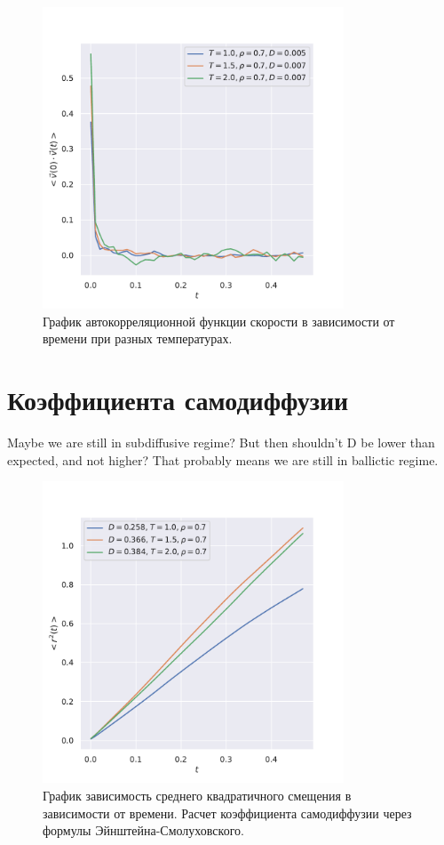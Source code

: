 \documentclass[a4paper,12pt]{article}
\begin{document}
\begin{figure}[H]
    \centering
    \includegraphics[width=0.8\textwidth]{../../media/vac.pdf}
\caption{График автокорреляционной функции
    скорости в зависимости от времени при разных
температурах.}
\end{figure}

\section{Коэффициента самодиффузии}

{\color{red} Maybe we are still in subdiffusive regime?
But then shouldn't D be lower than expected, and not
higher? That probably means we are still in ballictic
regime.}

\begin{figure}[H]
    \centering
    \includegraphics[width=0.8\textwidth]{../../media/diffusion.pdf}
\caption{График зависимость среднего квадратичного
смещения в зависимости от времени. Расчет коэффициента
самодиффузии через формулы Эйнштейна-Смолуховского.}
\end{figure}
\end{document}
